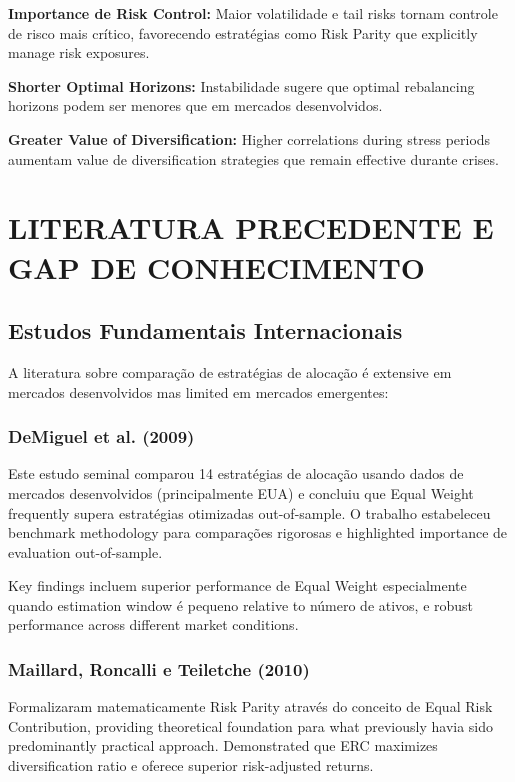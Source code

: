 \textbf{Importance de Risk Control:} Maior volatilidade e tail risks tornam controle de risco mais crítico, favorecendo estratégias como Risk Parity que explicitly manage risk exposures.

\textbf{Shorter Optimal Horizons:} Instabilidade sugere que optimal rebalancing horizons podem ser menores que em mercados desenvolvidos.

\textbf{Greater Value of Diversification:} Higher correlations during stress periods aumentam value de diversification strategies que remain effective durante crises.

\section{LITERATURA PRECEDENTE E GAP DE CONHECIMENTO}

\subsection{Estudos Fundamentais Internacionais}

A literatura sobre comparação de estratégias de alocação é extensive em mercados desenvolvidos mas limited em mercados emergentes:

\subsubsection{DeMiguel et al. (2009)}

Este estudo seminal comparou 14 estratégias de alocação usando dados de mercados desenvolvidos (principalmente EUA) e concluiu que Equal Weight frequently supera estratégias otimizadas out-of-sample. O trabalho estabeleceu benchmark methodology para comparações rigorosas e highlighted importance de evaluation out-of-sample.

Key findings incluem superior performance de Equal Weight especialmente quando estimation window é pequeno relative to número de ativos, e robust performance across different market conditions.

\subsubsection{Maillard, Roncalli e Teiletche (2010)}

Formalizaram matematicamente Risk Parity através do conceito de Equal Risk Contribution, providing theoretical foundation para what previously havia sido predominantly practical approach. Demonstrated que ERC maximizes diversification ratio e oferece superior risk-adjusted returns.


